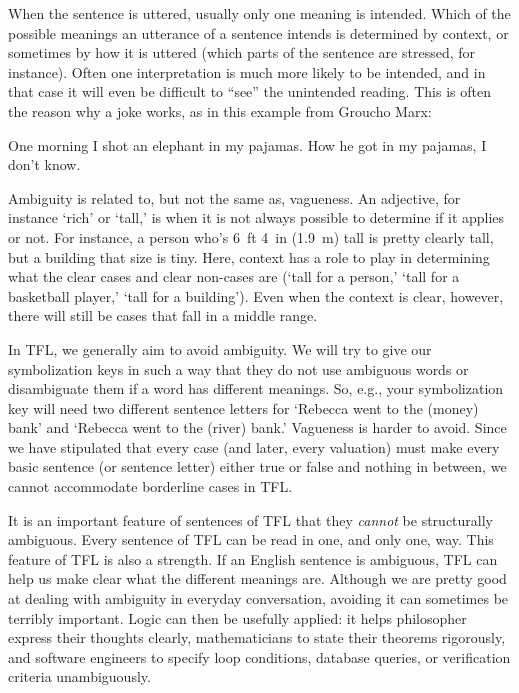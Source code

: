 When the sentence is uttered, usually only one meaning is intended. Which of the possible meanings an utterance of a sentence intends is determined by context, or sometimes by how it is uttered (which parts of the sentence are stressed, for instance). Often one interpretation is much more likely to be intended, and in that case it will even be difficult to ``see'' the unintended reading.  This is often the reason why a joke works, as in this example from Groucho Marx:
\begin{earg}
	\prem One morning I shot an elephant in my pajamas.
	\prem How he got in my pajamas, I don't know.
\end{earg}

Ambiguity is related to, but not the same as, vagueness. An adjective, for instance `rich' or `tall,' is  when it is not always possible to determine if it applies or not.  For instance, a person who's 6~ft 4~in (1.9~m) tall is pretty clearly tall, but a building that size is tiny.  Here, context has a role to play in determining what the clear cases and clear non-cases are (`tall for a person,' `tall for a basketball player,' `tall for a building'). Even when the context is clear, however, there will still be cases that fall in a middle range.

In TFL, we generally aim to avoid ambiguity. We will try to give our symbolization keys in such a way that they do not use ambiguous words or  disambiguate them if a word has different meanings. So, e.g., your symbolization key will need two different sentence letters for `Rebecca went to the (money) bank' and `Rebecca went to the (river) bank.' Vagueness is harder to avoid. Since we have stipulated that every case (and later, every valuation) must make every basic sentence (or sentence letter) either true or false and nothing in between, we cannot accommodate borderline cases in TFL.

It is an important feature of sentences of TFL that they \emph{cannot} be structurally ambiguous. Every sentence of TFL can be read in one, and only one, way. This feature of TFL is also a strength. If an English sentence is ambiguous, TFL can help us make clear what the different meanings are.  Although we are pretty good at dealing with ambiguity in everyday conversation, avoiding it can sometimes be terribly important. Logic can then be usefully applied: it helps philosopher express their thoughts clearly, mathematicians to state their theorems rigorously, and software engineers to specify loop conditions, database queries, or verification criteria unambiguously.

